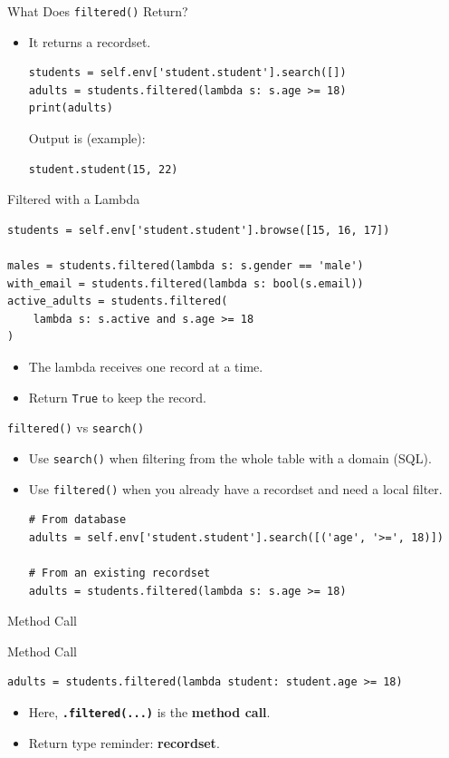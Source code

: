 \begin{frame}[fragile]{What Does \texttt{filtered()} Return?}
	\begin{block}{}
		\begin{itemize}
			\item It returns a recordset.
\begin{lstlisting}
students = self.env['student.student'].search([])
adults = students.filtered(lambda s: s.age >= 18)
print(adults)
\end{lstlisting}
			Output is (example):
\begin{lstlisting}
student.student(15, 22)
\end{lstlisting}
		\end{itemize}
	\end{block}
\end{frame}

\begin{frame}[fragile]{Filtered with a Lambda}
\begin{lstlisting}
students = self.env['student.student'].browse([15, 16, 17])

males = students.filtered(lambda s: s.gender == 'male')
with_email = students.filtered(lambda s: bool(s.email))
active_adults = students.filtered(
	lambda s: s.active and s.age >= 18
)
\end{lstlisting}
	\begin{itemize}
		\item The lambda receives one record at a time.
		\item Return \texttt{True} to keep the record.
	\end{itemize}
\end{frame}

\begin{frame}[fragile]{\texttt{filtered()} vs \texttt{search()}}
	\begin{itemize}
		\item Use \texttt{search()} when filtering from the whole table with a domain (SQL).
		\item Use \texttt{filtered()} when you already have a recordset and need a local filter.
\begin{lstlisting}
# From database
adults = self.env['student.student'].search([('age', '>=', 18)])

# From an existing recordset
adults = students.filtered(lambda s: s.age >= 18)
\end{lstlisting}
	\end{itemize}
\end{frame}

\begin{frame}[fragile]{Method Call}
\begin{block}{Method Call}
\begin{lstlisting}
adults = students.filtered(lambda student: student.age >= 18)
\end{lstlisting}
	\begin{itemize}
		\item Here, \textbf{\texttt{.filtered(...)}} is the \textbf{method call}.
		\item Return type reminder: \textbf{recordset}.
	\end{itemize}
\end{block}
\end{frame}
